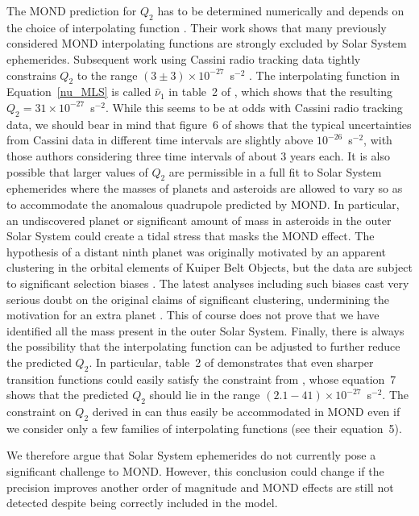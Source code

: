 \documentclass[fleqn,usenatbib,useAMS,onecolumn]{mnras} %
\begin{document}
The MOND prediction for $Q_2$ has to be determined numerically and depends on the choice of interpolating function \citep{Blanchet_2011}. Their work shows that many previously considered MOND interpolating functions are strongly excluded by Solar System ephemerides. Subsequent work using Cassini radio tracking data \citep{Matson_1992} tightly constrains $Q_2$ to the range $\left(3 \pm 3\right) \times 10^{-27}$~s$^{-2}$ \citep{Hees_2014}. The interpolating function in Equation~\ref{nu_MLS} is called $\hat{\nu}_1$ in table~2 of \citet{Hees_2016}, which shows that the resulting $Q_2 = 31 \times 10^{-27}$~s$^{-2}$. While this seems to be at odds with Cassini radio tracking data, we should bear in mind that figure~6 of \citet{Hees_2014} shows that the typical uncertainties from Cassini data in different time intervals are slightly above $10^{-26}$~s$^{-2}$, with those authors considering three time intervals of about 3 years each. It is also possible that larger values of $Q_2$ are permissible in a full fit to Solar System ephemerides where the masses of planets and asteroids are allowed to vary so as to accommodate the anomalous quadrupole predicted by MOND. In particular, an undiscovered planet \citep{Batygin_2016} or significant amount of mass in asteroids in the outer Solar System could create a tidal stress that masks the MOND effect. The hypothesis of a distant ninth planet was originally motivated by an apparent clustering in the orbital elements of Kuiper Belt Objects, but the data are subject to significant selection biases \citep{Shankman_2017}. The latest analyses including such biases cast very serious doubt on the original claims of significant clustering, undermining the motivation for an extra planet \citep{Bernardinelli_2020, Napier_2021}. This of course does not prove that we have identified all the mass present in the outer Solar System. Finally, there is always the possibility that the interpolating function can be adjusted to further reduce the predicted $Q_2$. In particular, table~2 of \citet{Hees_2016} demonstrates that even sharper transition functions could easily satisfy the constraint from \citet{Hees_2014}, whose equation~7 shows that the predicted $Q_2$ should lie in the range $\left(2.1-41\right) \times 10^{-27}$~s$^{-2}$. The constraint on $Q_2$ derived in \citet{Hees_2014} can thus easily be accommodated in MOND even if we consider only a few families of interpolating functions (see their equation~5).

We therefore argue that Solar System ephemerides do not currently pose a significant challenge to MOND. However, this conclusion could change if the precision improves another order of magnitude and MOND effects are still not detected despite being correctly included in the model.
\end{document}
